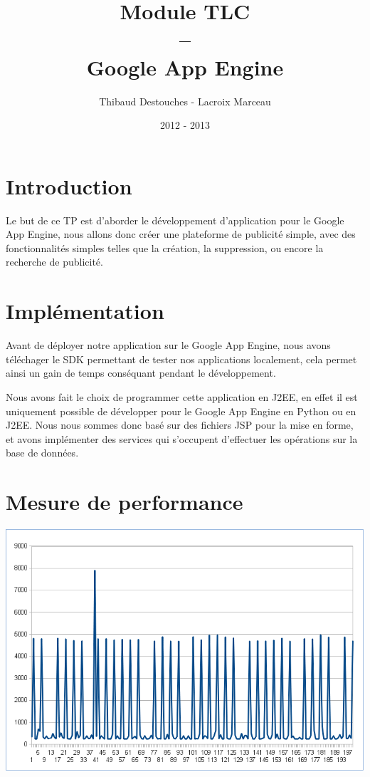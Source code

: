 \documentclass{article}
\title{Module TLC
\\
--
\\
Google App Engine}
\author{Thibaud Destouches - Lacroix Marceau}
\date{2012 - 2013}
\begin{document}
\begin{titlepage}
\maketitle
\tableofcontents
\end{titlepage}

\newpage
\section{Introduction}

Le but de ce TP est d’aborder le développement d'application pour le Google App Engine, nous allons donc créer une plateforme de publicité simple, avec des fonctionnalités simples telles que la création, la suppression, ou encore la recherche de publicité.

\section{Implémentation}
Avant de déployer notre application sur le Google App Engine, nous avons téléchager le SDK permettant de tester nos applications localement, cela permet ainsi un gain de temps conséquant pendant le développement.

Nous avons fait le choix de programmer cette application en J2EE, en effet il est uniquement possible de développer pour le Google App Engine en Python ou en J2EE. Nous nous sommes donc basé sur des fichiers JSP pour la mise en forme, et avons implémenter des services qui s'occupent d'effectuer les opérations sur la base de données.

\section{Mesure de performance}
\includegraphics[scale=0.5]{measure}
\end{document}

